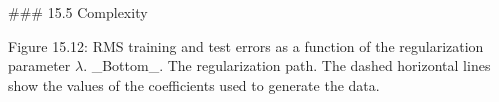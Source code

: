 

### 15.5 Complexity

Figure 15.12: RMS training and test errors as a function of the regularization parameter \(\lambda\). _Bottom_. The regularization path. The dashed horizontal lines show the values of the coefficients used to generate the data.

